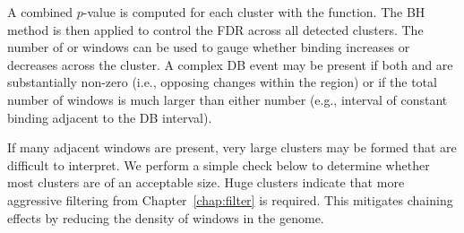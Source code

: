 \documentclass{report}\usepackage[]{graphicx}\usepackage[usenames,dvipsnames]{color}
\newcommand{\hlopt}[1]{\textcolor[rgb]{0,0,0}{#1}}%
\newcommand{\hlstd}[1]{\textcolor[rgb]{0.251,0.251,0.251}{#1}}%
\newcommand{\hlkwb}[1]{\textcolor[rgb]{0,0,0}{#1}}%
\newcommand{\hlkwd}[1]{\textcolor[rgb]{0.878,0.439,0.125}{#1}}%
\newenvironment{knitrout}{}{} %
\begin{document}
A combined $p$-value is computed for each cluster with the  function.
The BH method is then applied to control the FDR across all detected clusters.
The number of  or  windows can be used to gauge whether binding increases or decreases across the cluster.
A complex DB event may be present if both  and  are substantially non-zero (i.e., opposing changes within the region) or if the total number of windows is much larger than either number (e.g., interval of constant binding adjacent to the DB interval).

\begin{knitrout}
\color{fgcolor}
\end{knitrout}

If many adjacent windows are present, very large clusters may be formed that are difficult to interpret. 
We perform a simple check below to determine whether most clusters are of an acceptable size. 
Huge clusters indicate that more aggressive filtering from Chapter~\ref{chap:filter} is required.  
This mitigates chaining effects by reducing the density of windows in the genome.

\end{document}
